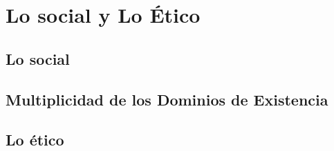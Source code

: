 \documentclass[10pt]{article}
\begin{document}
    \section{Lo social y Lo Ético}

        \subsection{Lo social}

        \subsection{Multiplicidad de los Dominios de Existencia}

        \subsection{Lo ético}
\end{document}
